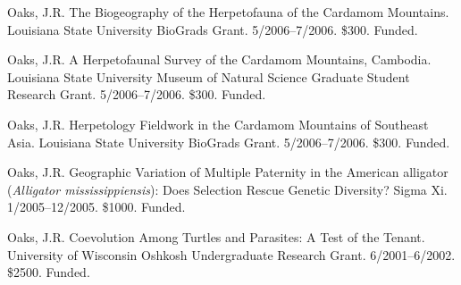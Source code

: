 {\myHangIndent
Oaks, J.R.
The Biogeography of the Herpetofauna of the Cardamom Mountains.
Louisiana State University BioGrads Grant.
5/2006--7/2006.
\$300.
Funded.

\myHangIndent
Oaks, J.R.
A Herpetofaunal Survey of the Cardamom Mountains, Cambodia.
Louisiana State University Museum of Natural Science Graduate Student Research
Grant.
5/2006--7/2006.
\$300.
Funded.

\myHangIndent
Oaks, J.R.
Herpetology Fieldwork in the Cardamom Mountains of Southeast Asia.
Louisiana State University BioGrads Grant.
5/2006--7/2006.
\$300.
Funded.

\myHangIndent
Oaks, J.R.
Geographic Variation of Multiple Paternity in the American alligator
(\emph{Alligator mississippiensis}): Does Selection Rescue Genetic Diversity?
Sigma Xi.
1/2005--12/2005.
\$1000.
Funded.

\myHangIndent
Oaks, J.R.
Coevolution Among Turtles and Parasites: A Test of the Tenant.
University of Wisconsin Oshkosh Undergraduate Research Grant.
6/2001--6/2002.
\$2500.
Funded.
}

